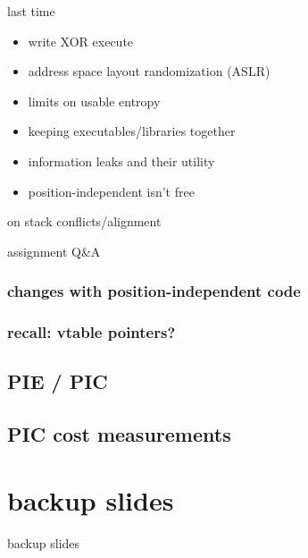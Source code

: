 \date{}
\title{}
\date{}

\begin{frame}
    \titlepage
\end{frame}



\begin{frame}{last time}
    \begin{itemize}
    \item write XOR execute
    \item address space layout randomization (ASLR)
    \item limits on usable entropy
    \item keeping executables/libraries together
    \item information leaks and their utility
    \item position-independent isn't free
    \end{itemize}
\end{frame}

\begin{frame}{on stack conflicts/alignment}
\end{frame}

\begin{frame}{assignment Q\&A}
\end{frame}


\subsubsection{changes with position-independent code}


\subsubsection{recall: vtable pointers?}


\subsection{PIE / PIC}


\subsection{PIC cost measurements}





\section{backup slides}
\begin{frame}{backup slides}
\end{frame}


